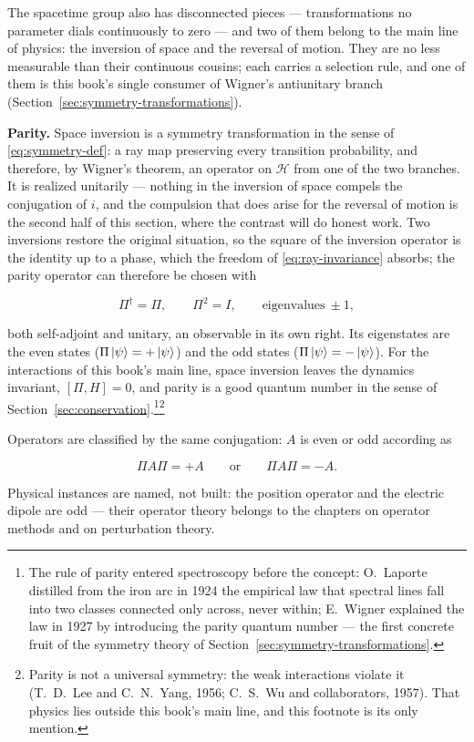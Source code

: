 The spacetime group also has disconnected pieces --- transformations no parameter dials continuously to zero --- and two of them belong to the main line of physics: the inversion of space and the reversal of motion. They are no less measurable than their continuous cousins; each carries a selection rule, and one of them is this book's single consumer of Wigner's antiunitary branch (Section~\ref{sec:symmetry-transformations}).

\medskip\noindent\textbf{Parity.} Space inversion is a symmetry transformation in the sense of \eqref{eq:symmetry-def}: a ray map preserving every transition probability, and therefore, by Wigner's theorem, an operator on $\mathcal{H}$ from one of the two branches. It is realized unitarily --- nothing in the inversion of space compels the conjugation of $i$, and the compulsion that does arise for the reversal of motion is the second half of this section, where the contrast will do honest work. Two inversions restore the original situation, so the square of the inversion operator is the identity up to a phase, which the freedom of \eqref{eq:ray-invariance} absorbs; the parity operator can therefore be chosen with
\begin{linenomath}
    \begin{equation}
        \Pi^\dagger = \Pi, \qquad \Pi^2 = I, \qquad \text{eigenvalues}\ \pm 1 ,
        \label{eq:parity-def}
    \end{equation}
\end{linenomath}
both self-adjoint and unitary, an observable in its own right. Its eigenstates are the even states ($\Pi\ket{\psi} = +\ket{\psi}$) and the odd states ($\Pi\ket{\psi} = -\ket{\psi}$). For the interactions of this book's main line, space inversion leaves the dynamics invariant, $[\Pi,H] = 0$, and parity is a good quantum number in the sense of Section~\ref{sec:conservation}.\footnote{The rule of parity entered spectroscopy before the concept: O.~Laporte distilled from the iron arc in 1924 the empirical law that spectral lines fall into two classes connected only across, never within; E.~Wigner explained the law in 1927 by introducing the parity quantum number --- the first concrete fruit of the symmetry theory of Section~\ref{sec:symmetry-transformations}.}\footnote{Parity is not a universal symmetry: the weak interactions violate it (T.~D.~Lee and C.~N.~Yang, 1956; C.~S.~Wu and collaborators, 1957). That physics lies outside this book's main line, and this footnote is its only mention.}

Operators are classified by the same conjugation: $A$ is even or odd according as
\begin{linenomath}
    \begin{equation}
        \Pi A \Pi = +A \qquad\text{or}\qquad \Pi A \Pi = -A .
        \label{eq:operator-parity}
    \end{equation}
\end{linenomath}
Physical instances are named, not built: the position operator and the electric dipole are odd --- their operator theory belongs to the chapters on operator methods and on perturbation theory.

